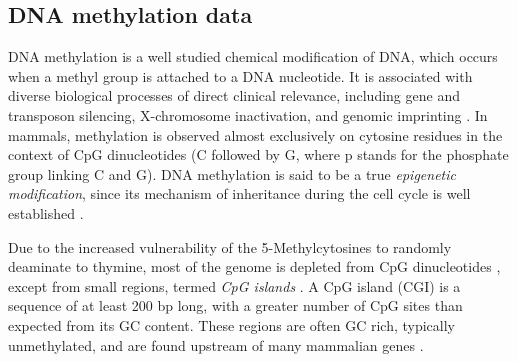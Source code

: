\subsection{DNA methylation data} \label{dna-methylation-data-sect}
DNA methylation is a well studied chemical modification of DNA, which occurs when a methyl group is attached to a DNA nucleotide. It is associated with diverse biological processes of direct clinical relevance, including gene and transposon silencing, X-chromosome inactivation, and  genomic imprinting \citep{Li1993, Mohandas1981}. In mammals,  methylation is observed almost exclusively on cytosine residues in the context of CpG dinucleotides (\ie C followed by G, where p stands for the phosphate group linking C and G). DNA methylation is said to be a true \emph{epigenetic modification}, since its mechanism of inheritance during the cell cycle is well established \citep{Law2010}. 

Due to the increased vulnerability of the 5-Methylcytosines to randomly deaminate to thymine, most of the genome is depleted from CpG dinucleotides \citep{Scarano1967}, except from small regions, termed \emph{CpG islands} \citep{Bird2002}. A CpG island (CGI) is a sequence of at least 200 bp long, with a greater number of CpG sites than expected from its GC content. These regions are often GC rich, typically unmethylated, and are found upstream of many mammalian genes \citep{Law2010}. 

